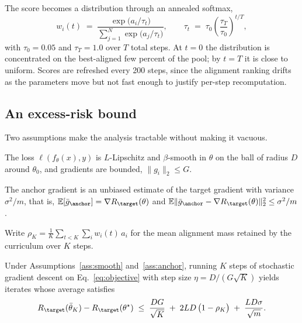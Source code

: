 The score becomes a distribution through an annealed softmax,
\begin{equation}
  \label{eq:weights}
  w_i(t) \;=\; \frac{\exp\bigl(a_i / \tau_t\bigr)}
                    {\sum_{j=1}^{N} \exp\bigl(a_j / \tau_t\bigr)} ,
  \qquad
  \tau_t \;=\; \tau_0 \left( \frac{\tau_T}{\tau_0} \right)^{t/T} ,
\end{equation}
with $\tau_0 = 0.05$ and $\tau_T = 1.0$ over $T$ total steps. At $t = 0$ the
distribution is concentrated on the best-aligned few percent of the pool; by
$t = T$ it is close to uniform. Scores are refreshed every 200 steps, since the
alignment ranking drifts as the parameters move but not fast enough to justify
per-step recomputation.

\subsection{An excess-risk bound}

Two assumptions make the analysis tractable without making it vacuous.

\begin{assumption}
\label{ass:smooth}
The loss $\ell(f_\theta(x), y)$ is $L$-Lipschitz and $\beta$-smooth in $\theta$
on the ball of radius $D$ around $\theta_0$, and gradients are bounded,
$\lVert g_i \rVert_2 \le G$.
\end{assumption}

\begin{assumption}
\label{ass:anchor}
The anchor gradient is an unbiased estimate of the target gradient with
variance $\sigma^2 / m$, that is,
$\mathbb{E}[\bar{g}_{\anchor}] = \nabla R_{\target}(\theta)$ and
$\mathbb{E}\lVert \bar{g}_{\anchor} - \nabla R_{\target}(\theta) \rVert_2^2
\le \sigma^2 / m$.
\end{assumption}

Write $\rho_K = \frac{1}{K} \sum_{t < K} \sum_i w_i(t) \, a_i$ for the mean
alignment mass retained by the curriculum over $K$ steps.

\begin{proposition}
\label{prop:risk}
Under Assumptions~\ref{ass:smooth} and~\ref{ass:anchor}, running $K$ steps of
stochastic gradient descent on Eq.~\eqref{eq:objective} with step size
$\eta = D / (G\sqrt{K})$ yields iterates whose average satisfies
\begin{equation}
  \label{eq:bound}
  R_{\target}(\bar{\theta}_K) - R_{\target}(\theta^{\star})
  \;\le\; \frac{D G}{\sqrt{K}}
  \;+\; 2 L D \,\bigl(1 - \rho_K\bigr)
  \;+\; \frac{L D \sigma}{\sqrt{m}} .
\end{equation}
\end{proposition}


